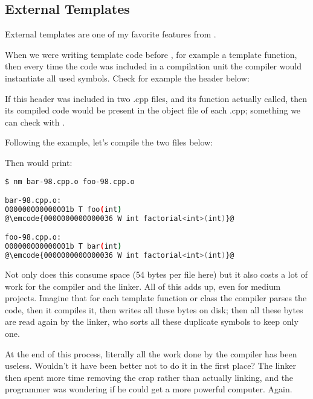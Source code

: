 \subsection{External Templates}

\problemtitle

External templates are one of my favorite features from .

When we were writing template code before , for example a
template function, then every time the code was included in a
compilation unit the compiler would instantiate all used
symbols. Check for example the header below:



If this header was included in two .cpp files, and its function
actually called, then its compiled code would be present in the object
file of each .cpp; something we can check with .

Following the example, let's compile the two files below:





Then  would print:

\begin{lstlisting}[language=bash]
$ nm bar-98.cpp.o foo-98.cpp.o

bar-98.cpp.o:
000000000000001b T foo(int)
@\emcode{0000000000000036 W int factorial<int>(int)}@

foo-98.cpp.o:
000000000000001b T bar(int)
@\emcode{0000000000000036 W int factorial<int>(int)}@
\end{lstlisting}

Not only does this consume space (54 bytes per file here) but it also
costs a lot of work for the compiler and the linker. All of this adds
up, even for medium projects. Imagine that for each template function
or class the compiler parses the code, then it compiles it, then
writes all these bytes on disk; then all these bytes are read again by
the linker, who sorts all these duplicate symbols to keep only one.

At the end of this process, literally all the work done by the
compiler has been useless. Wouldn't it have been better not to do it
in the first place? The linker then spent more time removing the crap
rather than actually linking, and the programmer was wondering if he
could get a more powerful computer. Again.

